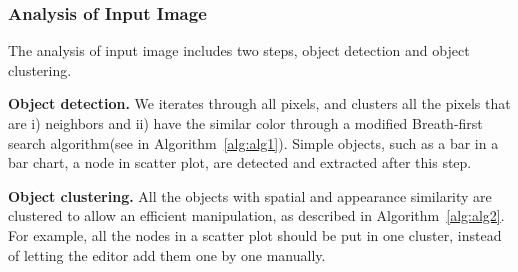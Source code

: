 \subsubsection{Analysis of Input Image}
The analysis of input image includes two steps, object detection and object clustering.

\noindent
\textbf{Object detection.} We iterates through all pixels, and clusters all the pixels that are i) neighbors and ii) have the similar color through a modified Breath-first search algorithm(see in Algorithm~\ref{alg:alg1}). Simple objects, such as a bar in a bar chart, a node in scatter plot, are detected and extracted after this step.

\noindent
\textbf{Object clustering.} All the objects with spatial and appearance similarity are clustered to allow an efficient manipulation, as described in Algorithm~\ref{alg:alg2}. For example, all the nodes in a scatter plot should be put in one cluster, instead of letting the editor add them one by one manually.     

